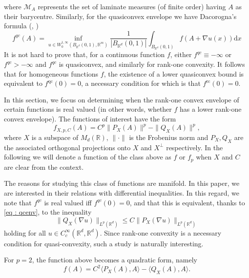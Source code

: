\documentclass[11pt, a4paper, reqno]{elsarticle}
\theoremstyle{definition}
\theoremstyle{remark}
\begin{document}
where $\mathcal M_A$ represents
the set of laminate measures (of finite order) having
$A$ as their barycentre.
Similarly, for the quasiconvex envelope
we have Dacorogna's formula (\cite[Theorem 6.9]{Dacorogna2008DirectVariations}, \cite[Appendix]{Kinderlehrer1991CharacterizationsGradients})
\begin{equation}
\label{eq : qcenv}
    f^{qc}(A)
=
    \underset{
    u\in W^{1,\infty}_0(B_{\mathbb{R}^d}(0,1), \mathbb{R}^m)
    }
\inf
    \frac{1}{|B_{\mathbb{R}^d}(0,1)|}
    \int_{B_{\mathbb{R}^d}(0,1)}f(A+\nabla u(x))\mathrm{d} x
\end{equation}
It is not hard to prove that, for
a continuous function $f$, either
$f^{qc}\equiv-\infty$ or 
$f^{qc}>-\infty$ and 
$f^{qc}$ is quasiconvex, 
and similarly for rank-one convexity.
It follows that for homogeneous functions $f$, the existence of a lower quasiconvex bound 
is equivalent to $f^{\mathrm{qc}}(0)=0$, a necessary condition for which is that $f^{\mathrm{rc}}(0)=0$.\par
In this section, we focus on determining when the
rank-one convex envelope of certain functions is real valued (in other words, 
whether $f$ has a lower rank-one convex envelope). The functions 
of interest have the form
\begin{equation}\label{eq : shape}
	f_{X,p,C}(A)
=
	C^p\| P_X(A)\|^p-\| Q_X(A)\|^p,
\end{equation}
where $X$ is a subspace of $M_d(\mathbb{R})$, $\|\cdot\|$ is the Frobenius norm
and $P_X, Q_X$ are the associated
orthogonal projections
onto $X$ and $X^\perp$
respectively.
 In the following we will
denote a function of the class above as $f$ or $f_p$
when $X$ and $C$
are clear from the context.\par
The reasons for studying this class of functions
are manifold. In this paper, we are interested in their 
relations with differential inequalities.
In this regard, we note that
$f^{qc}$ is real valued iff
$f^{qc}(0)=0$, and that this is 
equivalent, thanks to \eqref{eq : qcenv},
to the inequality
\begin{equation}\label{eq: coerc}
	\| Q_X(\nabla u)\|_{L^p(\mathbb{R}^d)}
\le
	C \| P_X(\nabla u)\|_{L^p(\mathbb{R}^d)}
\end{equation}
holding for all $u\in C^\infty_c(\mathbb{R}^d,\mathbb{R}^d)$.
Since rank-one convexity is a necessary
condition for quasi-convexity, such a study is naturally
interesting.\par
For $p=2$, the function above becomes a quadratic form, namely
\begin{equation*}
	f(A)
=
	C^2\langle P_X(A),A\rangle
-
	\langle Q_X(A), A\rangle.
\end{equation*}
\end{document}
